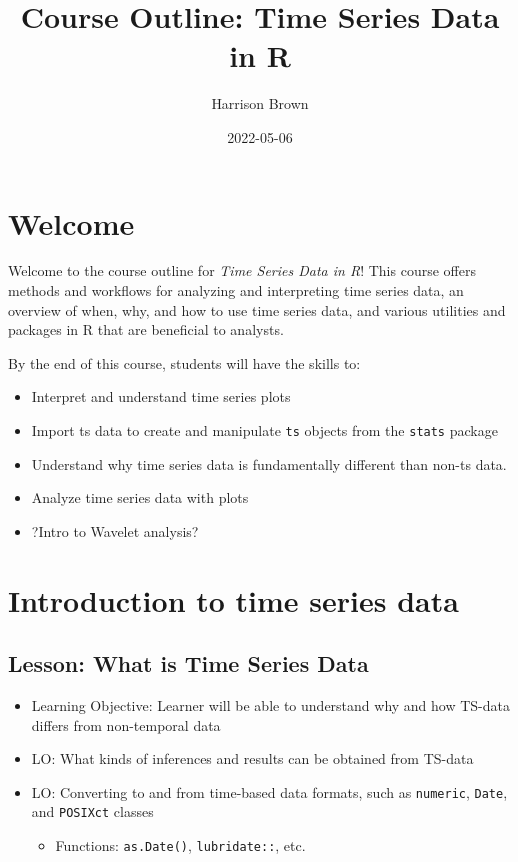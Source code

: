 \documentclass[
]{book}
\title{Course Outline: Time Series Data in R}
\author{Harrison Brown}
\date{2022-05-06}
\providecommand{\tightlist}{%
  \setlength{\itemsep}{0pt}\setlength{\parskip}{0pt}}
\begin{document}
\maketitle

{
\setcounter{tocdepth}{1}
\tableofcontents
}
\hypertarget{welcome}{%
\chapter*{Welcome}\label{welcome}}

Welcome to the course outline for \emph{Time Series Data in R}! This course offers methods and workflows for analyzing and interpreting time series data, an overview of when, why, and how to use time series data, and various utilities and packages in R that are beneficial to analysts.

By the end of this course, students will have the skills to:

\begin{itemize}
\tightlist
\item
  Interpret and understand time series plots
\item
  Import ts data to create and manipulate \texttt{ts} objects from the \texttt{stats} package
\item
  Understand why time series data is fundamentally different than non-ts data.
\item
  Analyze time series data with plots
\item
  ?Intro to Wavelet analysis?
\end{itemize}

\hypertarget{introduction-to-time-series-data}{%
\chapter{Introduction to time series data}\label{introduction-to-time-series-data}}

\hypertarget{lesson-what-is-time-series-data}{%
\section{Lesson: What is Time Series Data}\label{lesson-what-is-time-series-data}}

\begin{itemize}
\tightlist
\item
  Learning Objective: Learner will be able to understand why and how TS-data differs from non-temporal data
\item
  LO: What kinds of inferences and results can be obtained from TS-data
\item
  LO: Converting to and from time-based data formats, such as \texttt{numeric}, \texttt{Date}, and \texttt{POSIXct} classes

  \begin{itemize}
  \tightlist
  \item
    Functions: \texttt{as.Date()}, \texttt{lubridate::}, etc.
  \end{itemize}
\end{itemize}
\end{document}
